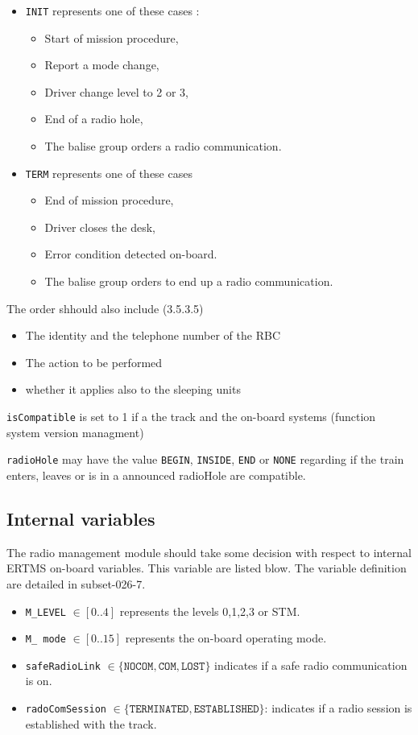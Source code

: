 \begin{description}
\begin{itemize}
  \item \verb+INIT+ represents one of these cases :
	\begin{itemize}
	\item Start of mission procedure,
	\item Report a mode change,
	\item Driver change level to 2 or 3,
	\item End of a radio hole,
	\item The balise group orders a radio communication.
	\end{itemize}
  \item \verb+TERM+ represents one of these cases
	\begin{itemize}
	\item End of mission procedure, 
	\item Driver closes the desk,
	\item Error condition detected on-board.
	\item The balise group orders to end up a radio communication.
	\end{itemize}
  \end{itemize}
The order shhould also include  (3.5.3.5)
\begin{itemize}
\item The identity and the telephone number of the RBC
\item The action to be performed
\item whether it applies also to the sleeping units
\end{itemize}
\item \verb+isCompatible+ is set to 1 if a the track and the on-board systems
(function system version managment)
\item \verb+radioHole+ may have the value \verb+BEGIN+, \verb+INSIDE+,
\verb+END+ or
\verb+NONE+ regarding if the train enters, leaves or is in a announced radioHole 
are compatible.
\end{description}

\subsection{Internal variables}
\label{subsec:internalvar}


The radio management module should take some decision with respect to internal
ERTMS on-board variables. This variable are listed blow. The variable definition
are detailed in subset-026-7.
\begin{itemize}
\item \verb+M_LEVEL+ $\in [0..4]$ represents the levels 0,1,2,3 or STM.
\item \verb+M_ mode+ $\in[0..15]$ represents the on-board operating mode.
\item \verb+safeRadioLink+ $\in \{\mathtt{NOCOM, COM, LOST}\}$ indicates if a safe radio communication is on.
\item \verb+radoComSession+ $\in \{\mathtt{TERMINATED, ESTABLISHED}\}$: indicates if a radio session is established with the track.
\end{itemize} 


